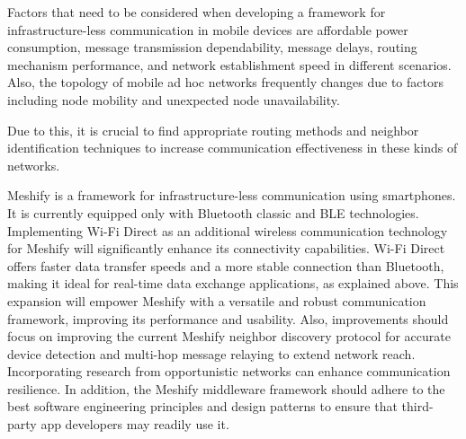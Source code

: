 Factors that need to be considered when developing a framework for
infrastructure-less communication in mobile devices are affordable power
consumption, message transmission dependability, message delays, routing
mechanism performance, and network establishment speed in
different scenarios. Also, the topology of mobile ad
hoc networks frequently changes due to factors including node mobility and
unexpected node unavailability.

Due to this, it is crucial to find appropriate routing methods and neighbor
identification techniques to increase communication effectiveness in these
kinds of networks.

Meshify is a framework for infrastructure-less communication using smartphones.
It is currently equipped only with Bluetooth classic and BLE
technologies\cite{gunasekara2022}. Implementing Wi-Fi Direct as an additional
wireless communication technology for Meshify will significantly enhance its
connectivity capabilities. Wi-Fi Direct offers faster data transfer speeds and
a more stable connection than Bluetooth, making it ideal for real-time data
exchange applications, as explained above. This expansion will empower Meshify
with a versatile and robust communication framework, improving its performance
and usability. Also, improvements should focus on improving the current Meshify
neighbor discovery protocol for accurate device detection and multi-hop message
relaying to extend network reach. Incorporating research from opportunistic
networks can enhance communication resilience. In addition, the Meshify
middleware framework should adhere to the best software engineering principles
and design patterns to ensure that third-party app developers may readily use
it.
